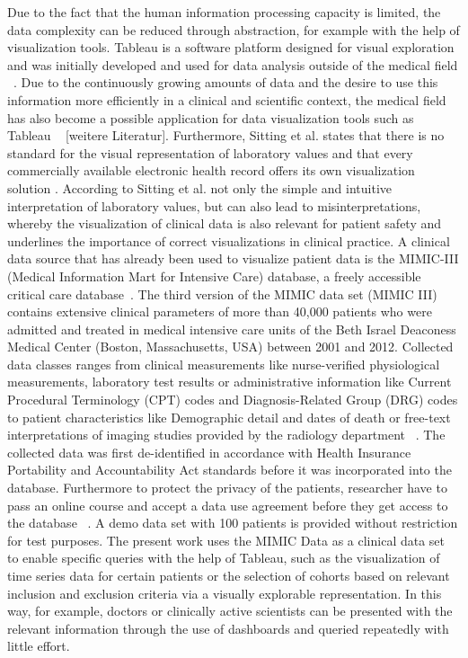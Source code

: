 \noindent Due to the fact that the human information processing capacity is limited, the data complexity can be reduced through abstraction, for example with the help of visualization tools. Tableau is a software platform designed for visual exploration and was initially developed and used for data analysis outside of the medical field ~\cite{Tableau.2021}. Due to the continuously growing amounts of data and the desire to use this information more efficiently in a clinical and scientific context, the medical field has also become a possible application for data visualization tools such as Tableau ~\cite{Ko.2017} [weitere Literatur]. 
Furthermore, Sitting et al. states that there is no standard for the visual representation of laboratory values and that every commercially available electronic health record offers its own visualization solution \cite{Sittig.2015}. According to Sitting et al. not only the simple and intuitive interpretation of laboratory values, but can also lead to misinterpretations, whereby the visualization of clinical data is also relevant for patient safety and underlines the importance of correct visualizations in clinical practice.
A clinical data source that has already been used to visualize patient data is the MIMIC-III (Medical Information Mart for Intensive Care) database, a freely accessible critical care database~\cite{Festag.2019,Lee.2016,Johnson.2020,Johnson.2016}. The third version of the MIMIC data set (MIMIC III) contains extensive clinical parameters of more than 40,000 patients who were admitted and treated in medical intensive care units of the Beth Israel Deaconess Medical Center (Boston, Massachusetts, USA) between 2001 and 2012. Collected data classes ranges from clinical measurements like nurse-verified physiological measurements, laboratory test results or administrative information like Current Procedural Terminology (CPT) codes and Diagnosis-Related Group (DRG) codes to patient characteristics like Demographic detail and dates of death or free-text interpretations of imaging studies provided by the radiology department ~\cite{Johnson.2020,Johnson.2016}. The collected data was first de-identified in accordance with Health Insurance Portability and Accountability Act standards before it was incorporated into the database. Furthermore to protect the privacy of the patients, researcher have to pass an online course and accept a data use agreement before they get access to the database ~\cite{Johnson.2020,Johnson.2016}. A demo data set with 100 patients is provided without restriction for test purposes. 
The present work uses the MIMIC Data as a clinical data set to enable specific queries with the help of Tableau, such as the visualization of time series data for certain patients or the selection of cohorts based on relevant inclusion and exclusion criteria via a visually explorable representation. In this way, for example, doctors or clinically active scientists can be presented with the relevant information through the use of dashboards and queried repeatedly with little effort.